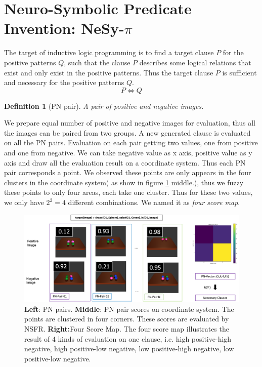 \documentclass[
]{ceurart}
\newtheorem{definition}{Definition}[section]
\begin{document}
	\section{Neuro-Symbolic Predicate Invention: NeSy-$ \pi $}
	The target of inductive logic programming is to find a target clause $ P $ for the positive patterns $Q$, such that the clause $ P $ describes some logical relations that exist and only exist in the positive patterns. 
	Thus the target clause $ P $ is sufficient and necessary for the positive patterns $ Q $.
	\[ P\Leftrightarrow Q \]
	
	\begin{definition}[PN pair]
		A pair of positive and negative images.
	\end{definition}
	We prepare equal number of positive and negative images for evaluation, thus all the images can be paired from two groups.
	A new generated clause is evaluated on all the PN pairs. Evaluation on each pair getting two values, one from positive and one from negative. 
	We can take negative value as x axis, positive value as y axis and draw all the evaluation result on a coordinate system. Thus each PN pair corresponds a point. We observed these points are only appears in the four clusters in the coordinate system( as show in figure \ref{fig:pn-pair} middle.), thus we fuzzy these points to only four areas, each take one cluster. Thus for these two values, we only have $ 2^2=4 $ different combinations. We named it as \textit{four score map}.
	
	
	\begin{figure}[t]
		\centering
		\begin{minipage}{\textwidth}
			\includegraphics[width=\linewidth]{img/four_zone_explain.png} 
			\caption{\textbf{Left}: PN pairs. \textbf{Middle}: PN pair scores on coordinate system. The points are clustered in four corners. These scores are evaluated by NSFR. \textbf{Right:}Four Score Map. The four score map illustrates the result of 4 kinds of evaluation on one clause, i.e. high positive-high negative, high positive-low negative, low positive-high negative, low positive-low negative. }
			\label{fig:pn-pair}
		\end{minipage}
	\end{figure}
	
\end{document}
